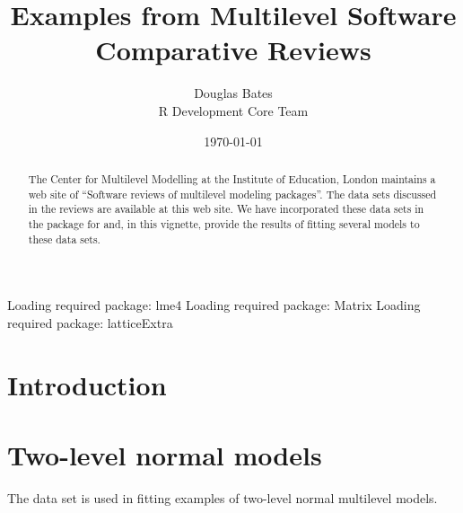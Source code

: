 \documentclass[12pt]{article}
\begin{document}
\title{Examples from Multilevel Software Comparative Reviews}
\author{Douglas Bates\\R Development Core Team\\}
\date{\today}
\maketitle
\begin{abstract}
   The Center for Multilevel Modelling at the Institute of Education,
   London maintains a web site of ``Software reviews of multilevel
   modeling packages''.  The data sets discussed in the reviews are
   available at this web site.  We have incorporated these data sets
   in the  package for \RR{} and, in this vignette, provide
   the results of fitting several models to these data sets.
\end{abstract}
\begin{Schunk}
\begin{Soutput}
Loading required package: lme4 
Loading required package: Matrix 
Loading required package: latticeExtra 
\end{Soutput}
\end{Schunk}

\section{Introduction}
\label{sec:Intro}


\section{Two-level normal models}
\label{sec:TwoLevelNormal}



The  data set is used in fitting examples of two-level
normal multilevel models.
\end{document}
